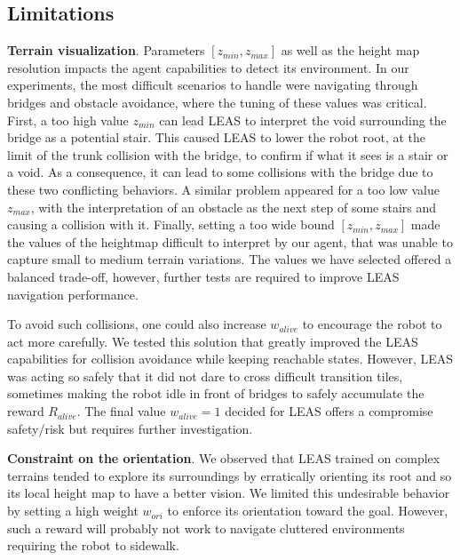 \subsection{Limitations}
\noindent\textbf{Terrain visualization}.
Parameters $[z_{min}, z_{max}]$ as well as the height map resolution impacts the agent capabilities to detect its environment.
In our experiments, the most difficult scenarios to handle were navigating through bridges and obstacle avoidance, where the tuning of these values was critical.
First, a too high value $z_{min}$ can lead LEAS to interpret the void surrounding the bridge as a potential stair.
This caused LEAS to lower the robot root, at the limit of the trunk collision with the bridge, to confirm if what it sees is a stair or a void. 
As a consequence, it can lead to some collisions with the bridge due to these two conflicting behaviors.
A similar problem appeared for a too low value $z_{max}$, with the interpretation of an obstacle as the next step of some stairs and causing a collision with it.
Finally, setting a too wide bound $[z_{min}, z_{max}]$ made the values of the heightmap difficult to interpret by our agent, that was unable to capture small to medium terrain variations.
The values we have selected offered a balanced trade-off, however, further tests are required to improve LEAS navigation performance.

To avoid such collisions, one could also increase $w_{alive}$ to encourage the robot to act more carefully. 
We tested this solution that greatly improved the LEAS capabilities for collision avoidance while keeping reachable states. However, LEAS was acting so safely that it did not dare to cross difficult transition tiles, sometimes making the robot idle in front of bridges to safely accumulate the reward $R_{alive}$. 
The final value $w_{alive}=1$ decided for LEAS offers a compromise safety/risk but requires further investigation. 

\hfill

\noindent\textbf{Constraint on the orientation}. 
We observed that LEAS trained on complex terrains tended to explore its surroundings by erratically orienting its root and so its local height map to have a better vision.
We limited this undesirable behavior by setting a high weight $w_{ori}$ to enforce its orientation toward the goal. 
However, such a reward will probably not work to navigate cluttered environments requiring the robot to sidewalk.

